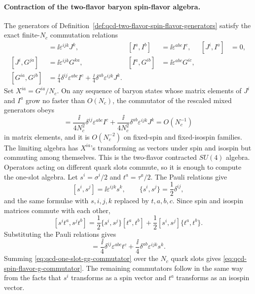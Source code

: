 \paragraph{Contraction of the two-flavor baryon spin-flavor algebra.}
The generators of Definition~\ref{def:qcd-two-flavor-spin-flavor-generators}
satisfy the exact finite-\(N_c\) commutation relations
\begin{align}
  [J^i,J^j]&=\ii\varepsilon^{ijk}J^k,
  &
  [I^a,I^b]&=\ii\varepsilon^{abc}I^c,
  &
  [J^i,I^a]&=0,
  \label{eq:qcd-spin-flavor-ji-algebra}\\
  [J^i,G^{ja}]&=\ii\varepsilon^{ijk}G^{ka},
  &
  [I^a,G^{ib}]&=\ii\varepsilon^{abc}G^{ic},
  \label{eq:qcd-spin-flavor-g-vector}\\
  [G^{ia},G^{jb}]
  &=
  \frac{\ii}{4}\delta^{ij}\varepsilon^{abc}I^c
  +
  \frac{\ii}{4}\delta^{ab}\varepsilon^{ijk}J^k .
  \label{eq:qcd-spin-flavor-g-commutator}
\end{align}
Set \(X^{ia}=G^{ia}/N_c\).  On any sequence of baryon states whose matrix
elements of \(J^i\) and \(I^a\) grow no faster than \(O(N_c)\), the
commutator of the rescaled mixed generators obeys
\begin{equation}
  [X^{ia},X^{jb}]
  =
  \frac{\ii}{4N_c^2}\delta^{ij}\varepsilon^{abc}I^c
  +
  \frac{\ii}{4N_c^2}\delta^{ab}\varepsilon^{ijk}J^k
  =
  O(N_c^{-1})
  \label{eq:qcd-contracted-su4-xx}
\end{equation}
in matrix elements, and it is \(O(N_c^{-2})\) on fixed-spin and fixed-isospin
families.  The limiting algebra has \(X^{ia}\)'s transforming as vectors
under spin and isospin but commuting among themselves.  This is the
two-flavor contracted \(SU(4)\) algebra.
Operators acting on different quark slots commute, so it is enough to compute
the one-slot algebra.  Let \(s^i=\sigma^i/2\) and \(t^a=\tau^a/2\).  The
Pauli relations give
\[
  [s^i,s^j]=\ii\varepsilon^{ijk}s^k,\qquad
  \{s^i,s^j\}=\frac12\delta^{ij},
\]
and the same formulae with \(s,i,j,k\) replaced by \(t,a,b,c\).  Since spin
and isospin matrices commute with each other,
\[
  [s^i t^a,s^j t^b]
  =
  \frac12\{s^i,s^j\}[t^a,t^b]
  +
  \frac12[s^i,s^j]\{t^a,t^b\}.
\]
Substituting the Pauli relations gives
\begin{equation}
  [s^i t^a,s^j t^b]
  =
  \frac{\ii}{4}\delta^{ij}\varepsilon^{abc}t^c
  +
  \frac{\ii}{4}\delta^{ab}\varepsilon^{ijk}s^k .
  \label{eq:qcd-one-slot-gg-commutator}
\end{equation}
Summing \eqref{eq:qcd-one-slot-gg-commutator} over the \(N_c\) quark slots
gives \eqref{eq:qcd-spin-flavor-g-commutator}.  The remaining commutators
follow in the same way from the facts that \(s^i\) transforms as a spin vector
and \(t^a\) transforms as an isospin vector.

